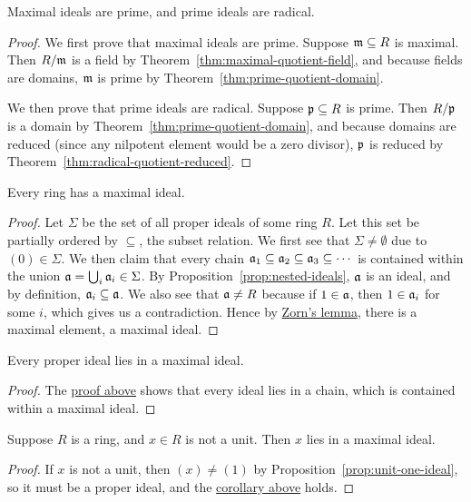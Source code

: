 \begin{theorem}\label{thm:maximal-prime-radical}
    Maximal ideals are prime, and prime ideals are radical.
\end{theorem}
\begin{proof}
    We first prove that maximal ideals are prime.
    Suppose \(\mathfrak{m} \subseteq R\) is maximal.
    Then \(R/\mathfrak{m}\) is a field by Theorem~\ref{thm:maximal-quotient-field},
    and because fields are domains,
    \(\mathfrak{m}\) is prime by Theorem~\ref{thm:prime-quotient-domain}.

    We then prove that prime ideals are radical.
    Suppose \(\mathfrak{p} \subseteq R\) is prime.
    Then \(R/\mathfrak{p}\) is a domain by Theorem~\ref{thm:prime-quotient-domain},
    and because domains are reduced (since any nilpotent element would be a zero divisor),
    \(\mathfrak{p}\) is reduced by Theorem~\ref{thm:radical-quotient-reduced}.
\end{proof}

\begin{theorem}\label{thm:maximal-ideal-exists}\label{thm:krull}
    Every ring has a maximal ideal.
\end{theorem}
\begin{proof}
    Let \(\Sigma\) be the set of all proper ideals of some ring \(R\).
    Let this set be partially ordered by \(\subseteq\), the subset relation.
    We first see that \(\Sigma\neq\emptyset\) due to \((0) \in \Sigma\).
    We then claim that every chain \(\mathfrak{a}_1 \subseteq \mathfrak{a}_2 \subseteq \mathfrak{a}_3 \subseteq \cdots\)
    is contained within the union \(\mathfrak{a} = \bigcup_i \mathfrak{a}_i \in \Sigma\).
    By Proposition~\ref{prop:nested-ideals}, \(\mathfrak{a}\) is an ideal,
    and by definition, \(\mathfrak{a}_i \subseteq \mathfrak{a}\).
    We also see that \(\mathfrak{a} \neq R\) because if \(1 \in \mathfrak{a}\),
    then \(1 \in \mathfrak{a}_i\) for some \(i\), which gives us a contradiction.
    Hence by \hyperref[ax:zorn]{Zorn's lemma}, there is a maximal element, a maximal ideal.
\end{proof}
\begin{corollary}\label{cor:proper-in-maximal}
    Every proper ideal lies in a maximal ideal.
\end{corollary}
\begin{proof}
    The \hyperref[thm:maximal-ideal-exists]{proof above} shows that
    every ideal lies in a chain,
    which is contained within a maximal ideal.
\end{proof}
\begin{corollary}
    Suppose \(R\) is a ring, and \(x \in R\) is not a unit.
    Then \(x\) lies in a maximal ideal.
\end{corollary}
\begin{proof}
    If \(x\) is not a unit,
    then \((x) \neq (1)\) by Proposition~\ref{prop:unit-one-ideal},
    so it must be a proper ideal,
    and the \hyperref[cor:proper-in-maximal]{corollary above} holds.
\end{proof}

